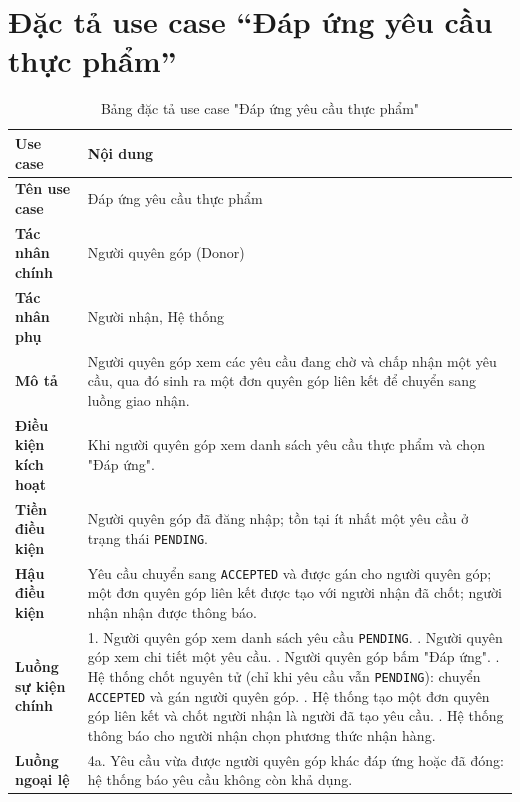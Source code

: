 \documentclass[../main.tex]{subfiles}
\begin{document}
\section{Đặc tả use case ``Đáp ứng yêu cầu thực phẩm''}

\begingroup
\renewcommand{\arraystretch}{1.45}
\begin{longtable}{|p{3.5cm}|p{11.5cm}|}
\caption{Bảng đặc tả use case "Đáp ứng yêu cầu thực phẩm"}
\label{tab:uc_dap_ung_yeu_cau}\\
\hline
\textbf{Use case} & \textbf{Nội dung} \\ \hline
\textbf{Tên use case} & Đáp ứng yêu cầu thực phẩm \\ \hline
\textbf{Tác nhân chính} & Người quyên góp (Donor) \\ \hline
\textbf{Tác nhân phụ} & Người nhận, Hệ thống \\ \hline
\textbf{Mô tả} & Người quyên góp xem các yêu cầu đang chờ và chấp nhận một yêu cầu, qua đó sinh ra một đơn quyên góp liên kết để chuyển sang luồng giao nhận. \\ \hline
\textbf{Điều kiện kích hoạt} & Khi người quyên góp xem danh sách yêu cầu thực phẩm và chọn "Đáp ứng". \\ \hline
\textbf{Tiền điều kiện} & Người quyên góp đã đăng nhập; tồn tại ít nhất một yêu cầu ở trạng thái \texttt{PENDING}. \\ \hline
\textbf{Hậu điều kiện} & Yêu cầu chuyển sang \texttt{ACCEPTED} và được gán cho người quyên góp; một đơn quyên góp liên kết được tạo với người nhận đã chốt; người nhận nhận được thông báo. \\ \hline
\textbf{Luồng sự kiện chính} &
1. Người quyên góp xem danh sách yêu cầu \texttt{PENDING}. \newline
2. Người quyên góp xem chi tiết một yêu cầu. \newline
3. Người quyên góp bấm "Đáp ứng". \newline
4. Hệ thống chốt nguyên tử (chỉ khi yêu cầu vẫn \texttt{PENDING}): chuyển \texttt{ACCEPTED} và gán người quyên góp. \newline
5. Hệ thống tạo một đơn quyên góp liên kết và chốt người nhận là người đã tạo yêu cầu. \newline
6. Hệ thống thông báo cho người nhận chọn phương thức nhận hàng. \\ \hline
\textbf{Luồng ngoại lệ} &
4a. Yêu cầu vừa được người quyên góp khác đáp ứng hoặc đã đóng: hệ thống báo yêu cầu không còn khả dụng. \\ \hline
\end{longtable}
\endgroup
\end{document}
